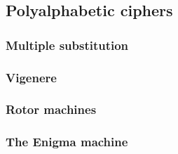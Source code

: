 
\subsection{Polyalphabetic ciphers}

\subsubsection{Multiple substitution}

\subsubsection{Vigenere}

\subsubsection{Rotor machines}

\subsubsection{The Enigma machine}


